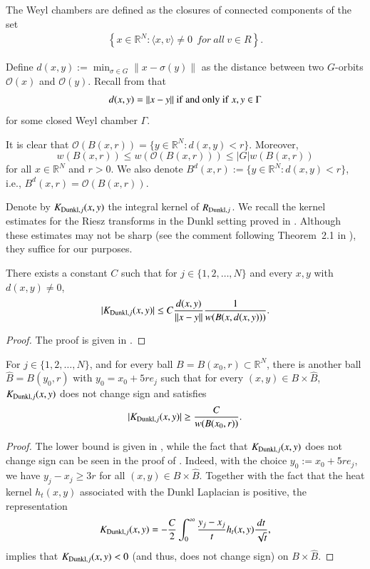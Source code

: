 \documentclass[12pt]{amsart}
\begin{document}
\begin{definition}{\rm
The Weyl chambers are defined as the closures of connected components of the set
  \begin{align}
    \left\{x\in\mathbb{R}^N:\langle x,v\rangle \neq 0\ \ { for} \ { all} \ v\in R\right\}.\end{align}}
\end{definition}
Define $
	d(x,y):=\min_{\sigma\in G}\|x-\sigma(y)\|
$
as the distance between two $G$-orbits $\mathcal O(x)$ and $\mathcal O(y)$. Recall from \cite[Chapter VII, proof of Theorem 2.12]{MR514561} that
\begin{align}\label{distanceequa}
d(x,y)=\|x-y\|\ {\rm if}\ {\rm and}\ {\rm only}\ {\rm if}\ x,y\in\Gamma
\end{align}
for some closed Weyl chamber $\Gamma$.

It is clear that $\mathcal O(B(x,r)) = \{y\in \mathbb{R}^N: d(x,y)<r\}$. Moreover,
\[
w(B(x,r)) \leq w(\mathcal O(B(x,r))) \leq |G|w(B(x,r))
\]
for all $x \in \mathbb{R}^N$ and $r>0$. We also denote $B^d(x,r):= \{y\in \mathbb{R}^N: d(x,y)<r\}$, i.e., $B^d(x,r)=\mathcal O(B(x,r))$.

Denote by $K_{{\rm Dunkl},j}(x,y)$ the integral kernel of $R_{{\rm Dunkl},j}$. We recall the kernel estimates for the Riesz transforms in the Dunkl setting proved in \cite{MR4733961}. Although these estimates may not be sharp (see the comment following Theorem~2.1 in \cite[p.~10]{MR4733961}), they suffice for our purposes.
\begin{lemma}\label{kernelestimate}
There exists a constant $C$ such that for $j\in\{1,2,\ldots,N\}$ and every $x,y$ with $d(x,y)\neq 0$,
\begin{align*}
|K_{{\rm Dunkl},j}(x,y)|\leq C\frac{d(x,y)}{\|x-y\|}\frac{1}{w(B(x,d(x,y)))}.
\end{align*}
\end{lemma}
\begin{proof}
The proof is given in \cite[Theorem 1.1]{MR4733961}.
\end{proof}

\begin{lemma}\label{nondegenerate}
For $j\in\{1,2,\ldots,N\}$, and for every ball $B=B(x_0,r)\subset \mathbb{R}^N$, there is another ball $\widehat{B}=B(y_0,r)$ with $y_0=x_0+5re_j$ such that for every $(x,y)\in B\times \widehat{B}$, $K_{{\rm Dunkl},j}(x,y)$ does not change sign and satisfies
\begin{align*}
|K_{{\rm Dunkl},j}(x,y)|\geq\frac{C}{w(B(x_0,r))}.
\end{align*}
\end{lemma}
\begin{proof}
The lower bound is given in \cite[Theorem 1.2]{MR4733961}, while the fact that $K_{{\rm Dunkl},j}(x,y)$ does not change sign can be seen in the proof of \cite[Theorem 1.2]{MR4733961}. Indeed, with the choice $y_0:=x_0+5re_j$, we have $y_j-x_j\geq 3r$ for all $(x,y)\in B\times \widehat{B}$. Together with the fact that the heat kernel $h_t(x,y)$ associated with the Dunkl Laplacian is  positive, the representation
$$K_{{\rm Dunkl},j}(x,y)=-\frac{C}{2}\int_0^\infty \frac{y_j-x_j}{t}h_t(x,y)\frac{dt}{\sqrt{t}},$$
implies that $K_{{\rm Dunkl},j}(x,y)<0$ (and thus, does not change sign) on $ B\times \widehat{B}$.
\end{proof}
\end{document}
